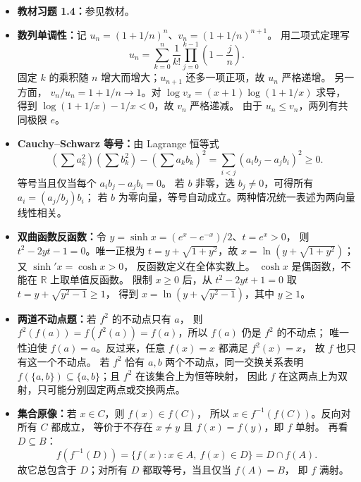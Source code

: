 \begin{itemize}
\item \textbf{教材习题 1.4：}参见教材。
\item \textbf{数列单调性：}记 $u_n=(1+1/n)^n$、$v_n=(1+1/n)^{n+1}$。
用二项式定理写
\[
u_n=\sum_{k=0}^n\frac1{k!}\prod_{j=0}^{k-1}\left(1-\frac jn\right).
\]
固定 $k$ 的乘积随 $n$ 增大而增大；$u_{n+1}$ 还多一项正项，故 $u_n$ 严格递增。
另一方面，
$v_n/u_n=1+1/n\to1$。对
$\log v_x=(x+1)\log(1+1/x)$ 求导，
得到 $\log(1+1/x)-1/x<0$，故 $v_n$ 严格递减。
由于 $u_n\le v_n$，两列有共同极限 $e$。
\item \textbf{Cauchy--Schwarz 等号：}由 Lagrange 恒等式
\[
\left(\sum a_k^2\right)\left(\sum b_k^2\right)
-\left(\sum a_kb_k\right)^2
=\sum_{i<j}(a_ib_j-a_jb_i)^2\ge0.
\]
等号当且仅当每个 $a_ib_j-a_jb_i=0$。
若 $b$ 非零，选 $b_j\ne0$，可得所有 $a_i=(a_j/b_j)b_i$；
若 $b$ 为零向量，等号自动成立。两种情况统一表述为两向量线性相关。
\item \textbf{双曲函数反函数：}令 $y=\sinh x=(e^x-e^{-x})/2$、$t=e^x>0$，
则 $t^2-2yt-1=0$。唯一正根为 $t=y+\sqrt{1+y^2}$，故
$x=\ln(y+\sqrt{1+y^2})$；又 $\sinh' x=\cosh x>0$，
反函数定义在全体实数上。
$\cosh x$ 是偶函数，不能在 $\mathbb R$ 上取单值反函数。
限制 $x\ge0$ 后，从 $t^2-2yt+1=0$ 取 $t=y+\sqrt{y^2-1}\ge1$，
得到 $x=\ln(y+\sqrt{y^2-1})$，其中 $y\ge1$。
\item \textbf{两道不动点题：}若 $f^2$ 的不动点只有 $a$，
则 $f^2(f(a))=f(f^2(a))=f(a)$，所以 $f(a)$ 仍是 $f^2$ 的不动点；
唯一性迫使 $f(a)=a$。反过来，任意 $f(x)=x$ 都满足 $f^2(x)=x$，
故 $f$ 也只有这一个不动点。
若 $f^2$ 恰有 $a,b$ 两个不动点，同一交换关系表明
$f(\{a,b\})\subseteq\{a,b\}$；且 $f^2$ 在该集合上为恒等映射，
因此 $f$ 在这两点上为双射，只可能分别固定两点或交换两点。
\item \textbf{集合原像：}若 $x\in C$，则 $f(x)\in f(C)$，
所以 $x\in f^{-1}(f(C))$。反向对所有 $C$ 都成立，
等价于不存在 $x\ne y$ 且 $f(x)=f(y)$，即 $f$ 单射。
再看 $D\subseteq B$：
\[
f(f^{-1}(D))=\{f(x):x\in A,\ f(x)\in D\}=D\cap f(A).
\]
故它总包含于 $D$；对所有 $D$ 都取等号，当且仅当 $f(A)=B$，
即 $f$ 满射。
\end{itemize}


